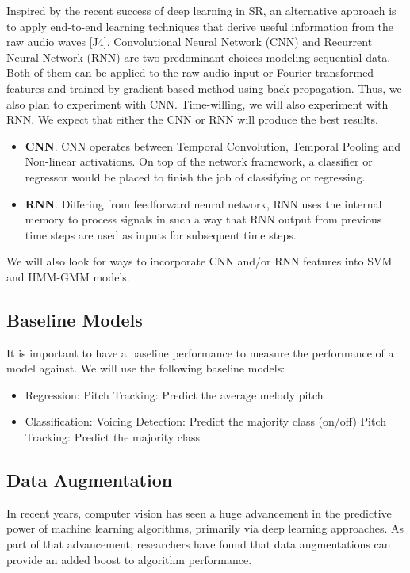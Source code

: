 \documentclass{article} %
\begin{document}
Inspired by the recent success of deep learning in SR, an alternative approach is to apply end-to-end learning techniques that derive useful information from the raw audio waves [J4]. 
Convolutional Neural Network (CNN) and Recurrent Neural Network (RNN) are two predominant choices modeling sequential data. Both of them can be applied to the raw audio input or Fourier transformed features and trained by gradient based method using back propagation.  Thus, we also plan to experiment with CNN.  Time-willing, we will also experiment with RNN.  We expect that either the CNN or RNN will produce the best results.
\begin{itemize}
\item \textbf{CNN}. CNN operates between Temporal Convolution, Temporal Pooling and Non-linear activations. On top of the network framework, a classifier or regressor would be placed to finish the job of classifying or regressing.
\item \textbf{RNN}. Differing from feedforward neural network, RNN uses the internal memory to process signals in such a way that RNN output from previous time steps are used as inputs for subsequent time steps.
\end{itemize}

We will also look for ways to incorporate CNN and/or RNN features into SVM and HMM-GMM models.

\subsection{Baseline Models}

It is important to have a baseline performance to measure the performance of a model against.  We will use the following baseline models:

\begin{itemize}
\item Regression:
\subitem Pitch Tracking: Predict the average melody pitch
\item Classification:
\subitem Voicing Detection:  Predict the majority class (on/off)
\subitem Pitch Tracking: Predict the majority class
\end{itemize}

\subsection{Data Augmentation}

In recent years, computer vision has seen a huge advancement in the predictive power of machine learning algorithms, primarily via deep learning approaches.  As part of that advancement, researchers have found that data augmentations can provide an added boost to algorithm performance.
\end{document}
